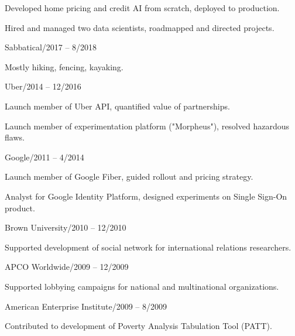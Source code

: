 \documentclass[12pt]{res}
\begin{document}
{\begin{resume}
\begin{list}{}{\leftmargin=1em}
{\begin{list}{}{\leftmargin=1em}
\begin{list}{-}{\leftmargin=1em}
\item Developed home pricing and credit AI from scratch, deployed to production.
\item Hired and managed two data scientists, roadmapped and directed projects.
\end{list}
\item Sabbatical/2017 -- 8/2018
\begin{list}{-}{\leftmargin=1em}
\item Mostly hiking, fencing, kayaking.
\end{list}
\item Uber/2014 -- 12/2016
\begin{list}{-}{\leftmargin=1em}
\item Launch member of Uber API, quantified value of partnerships.
\item Launch member of experimentation platform ("Morpheus"), resolved hazardous flaws.
\end{list}
\item Google/2011 -- 4/2014
\begin{list}{-}{\leftmargin=1em}
\item Launch member of Google Fiber, guided rollout and pricing strategy.
\item Analyst for Google Identity Platform, designed experiments on Single Sign-On product.
\end{list}
\item Brown University/2010 -- 12/2010
\begin{list}{-}{\leftmargin=1em}
\item Supported development of social network for international relations researchers.
\end{list}
\item APCO Worldwide/2009 -- 12/2009
\begin{list}{-}{\leftmargin=1em}
\item Supported lobbying campaigns for national and multinational organizations.
\end{list}
\item American Enterprise Institute/2009 -- 8/2009
\begin{list}{-}{\leftmargin=1em}
\item Contributed to development of Poverty Analysis Tabulation Tool (PATT).
\end{list}
\end{list}}
\item
\end{list}
\end{resume}
} %
\end{document}
